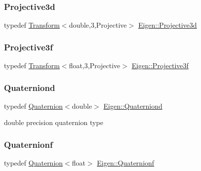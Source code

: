 \subsubsection{\texorpdfstring{Projective3d}{Projective3d}}
{\footnotesize\ttfamily typedef \mbox{\hyperlink{class_eigen_1_1_transform}{Transform}}$<$double,3,Projective$>$ \mbox{\hyperlink{group___geometry___module_ga3d2c61fbea04b09e4925a2e321b8b67c}{Eigen\+::\+Projective3d}}}

\mbox{\label{group___geometry___module_ga0546746224f5fd54d47ac8390eaefdd0}} 
\subsubsection{\texorpdfstring{Projective3f}{Projective3f}}
{\footnotesize\ttfamily typedef \mbox{\hyperlink{class_eigen_1_1_transform}{Transform}}$<$float,3,Projective$>$ \mbox{\hyperlink{group___geometry___module_ga0546746224f5fd54d47ac8390eaefdd0}{Eigen\+::\+Projective3f}}}

\mbox{\label{group___geometry___module_ga5daab8e66aa480465000308455578830}} 
\subsubsection{\texorpdfstring{Quaterniond}{Quaterniond}}
{\footnotesize\ttfamily typedef \mbox{\hyperlink{class_eigen_1_1_quaternion}{Quaternion}}$<$double$>$ \mbox{\hyperlink{group___geometry___module_ga5daab8e66aa480465000308455578830}{Eigen\+::\+Quaterniond}}}

double precision quaternion type \mbox{\label{group___geometry___module_ga66aa915a26d698c60ed206818c3e4c9b}} 
\subsubsection{\texorpdfstring{Quaternionf}{Quaternionf}}
{\footnotesize\ttfamily typedef \mbox{\hyperlink{class_eigen_1_1_quaternion}{Quaternion}}$<$float$>$ \mbox{\hyperlink{group___geometry___module_ga66aa915a26d698c60ed206818c3e4c9b}{Eigen\+::\+Quaternionf}}}

